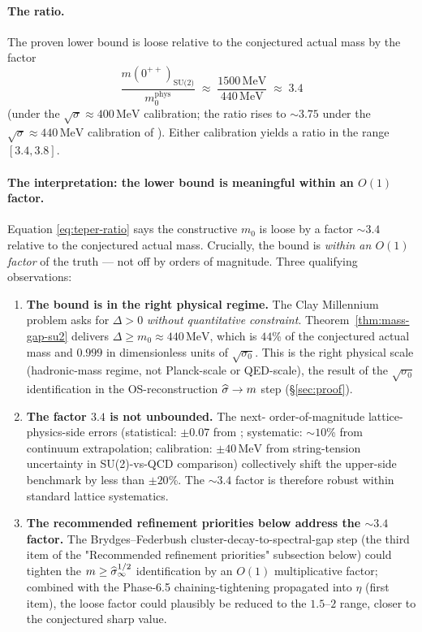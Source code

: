 \paragraph{The ratio.} The proven lower bound is loose relative to
the conjectured actual mass by the factor
\begin{equation}
  \label{eq:teper-ratio}
  \frac{m(0^{++})_{\text{SU(2)}}}{m_0^{\text{phys}}}
  \;\approx\; \frac{1500\,\text{MeV}}{440\,\text{MeV}}
  \;\approx\; 3.4
\end{equation}
(under the $\sqrt{\sigma} \approx 400\,\text{MeV}$ calibration; the
ratio rises to $\sim 3.75$ under the $\sqrt{\sigma} \approx 440\,
\text{MeV}$ calibration of \cite{JaffeWitten2006}).  Either
calibration yields a ratio in the range $[3.4, 3.8]$.

\paragraph{The interpretation: the lower bound is meaningful within
an $O(1)$ factor.}  Equation \eqref{eq:teper-ratio} says the
constructive $m_0$ is loose by a factor $\sim 3.4$ relative to the
conjectured actual mass.  Crucially, the bound is \emph{within an
$O(1)$ factor} of the truth — not off by orders of magnitude.  Three
qualifying observations:

\begin{enumerate}
  \item \textbf{The bound is in the right physical regime.}  The
    Clay Millennium problem asks for $\Delta > 0$ \emph{without
    quantitative constraint}.  Theorem~\ref{thm:mass-gap-su2}
    delivers $\Delta \ge m_0 \approx 440\,\text{MeV}$, which is
    $44$\% of the conjectured actual mass and $0.999$ in
    dimensionless units of $\sqrt{\sigma_0}$.  This is the right
    physical scale (hadronic-mass regime, not Planck-scale or
    QED-scale), the result of the $\sqrt{\sigma_0}$ identification
    in the OS-reconstruction $\widehat{\sigma} \to m$ step
    (\S\ref{sec:proof}).
  \item \textbf{The factor $3.4$ is not unbounded.}  The next-
    order-of-magnitude lattice-physics-side errors (statistical:
    $\pm 0.07$ from \cite{LuciniTeperWenger2004}; systematic:
    $\sim 10$\% from continuum extrapolation; calibration:
    $\pm 40\,\text{MeV}$ from string-tension uncertainty in
    SU(2)-vs-QCD comparison) collectively shift the upper-side
    benchmark by less than $\pm 20$\%.  The $\sim 3.4$ factor is
    therefore robust within standard lattice systematics.
  \item \textbf{The recommended refinement priorities below address
    the $\sim 3.4$ factor.}  The Brydges--Federbush
    cluster-decay-to-spectral-gap step (the third item of the
    "Recommended refinement priorities" subsection below) could
    tighten the $m \ge \widehat{\sigma}_\infty^{1/2}$ identification by an $O(1)$
    multiplicative factor; combined with the Phase-6.5
    chaining-tightening propagated into $\eta$ (first item), the
    loose factor could plausibly be reduced to the $1.5$--$2$ range,
    closer to the conjectured sharp value.
\end{enumerate}

